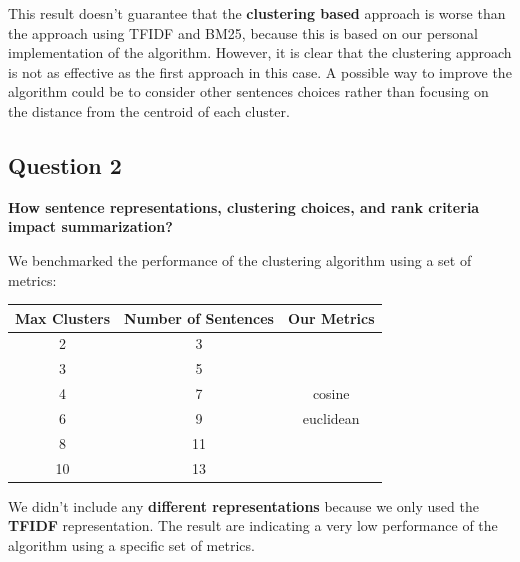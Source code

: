 This result doesn't guarantee that the \textbf{clustering based} approach is
worse than the approach using TFIDF and BM25, because this is based on our
personal implementation of the algorithm. However, it is clear that the
clustering approach is not as effective as the first approach in this case. A
possible way to improve the algorithm could be to consider other sentences
choices rather than focusing on the distance from the centroid of each cluster.

\subsection{Question 2}
\textbf{How sentence representations, clustering choices, and rank criteria impact summarization?}

We benchmarked the performance of the clustering algorithm using a set of
metrics:
\begin{table}[H]
  \centering
  \begin{tabular}{|c|c|c|}
    \hline
    \textbf{Max Clusters} & \textbf{Number of Sentences} & \textbf{Our Metrics} \\
    \hline
    2                     & 3                            &                      \\
    3                     & 5                            &                      \\
    4                     & 7                            & cosine               \\
    6                     & 9                            & euclidean            \\
    8                     & 11                           &                      \\
    10                    & 13                           &                      \\
    \hline
  \end{tabular}
\end{table}

We didn't include any \textbf{different representations} because we only used
the \textbf{TFIDF} representation. The result are indicating a very low
performance of the algorithm using a specific set of metrics.

